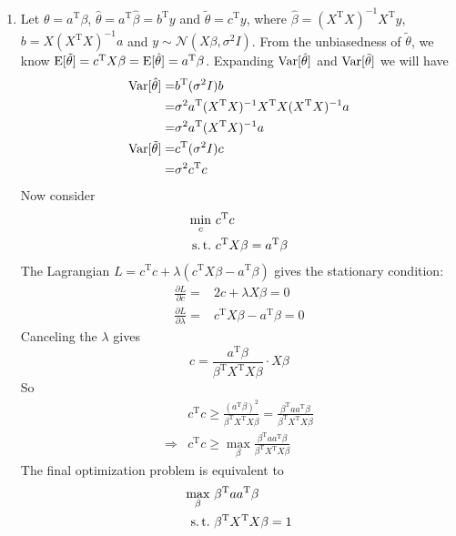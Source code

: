 \begin{sol}
\begin{enumerate}
\item
\label{3.3-1}
Let $\theta=a^\mathrm{T}\beta$, $\hat{\theta}=a^\mathrm{T}\hat{\beta}=b^\mathrm{T}y$ and $\tilde{\theta}=c^\mathrm{T}y$, where $\hat{\beta}=(X^{\mathrm{T}}X)^{-1}X^{\mathrm{T}}y$, $b=X(X^{\mathrm{T}}X)^{-1}a$ and $y\sim\mathcal{N}(X\beta,\sigma^2I)$. From the unbiasedness of $\tilde{\theta}$, we know $\operatorname{E}[\tilde{\theta}]=c^{\mathrm{T}}X\beta=\operatorname{E}[\hat{\theta}]=a^\mathrm{T}\beta$. Expanding $\operatorname{Var}[\hat{\theta}]$ and $\operatorname{Var}[\tilde{\theta}]$ we will have
\begin{align*}
\operatorname{Var}[\hat{\theta}] =& b^\mathrm{T}(\sigma^2 I)b\\
=& \sigma^2 a^\mathrm{T}(X^{\mathrm{T}}X)^{-1}X^\mathrm{T}X(X^{\mathrm{T}}X)^{-1}a\\
=& \sigma^2 a^\mathrm{T}(X^{\mathrm{T}}X)^{-1}a\\
\operatorname{Var}[\tilde{\theta}] =& c^\mathrm{T}(\sigma^2 I)c\\
=& \sigma^2 c^\mathrm{T}c
\end{align*}
Now consider
\begin{align*}
\min_c \ & c^\mathrm{T}c\\
\st & c^{\mathrm{T}}X\beta=a^\mathrm{T}\beta
\end{align*}
The Lagrangian $L=c^\mathrm{T}c+\lambda(c^{\mathrm{T}}X\beta-a^\mathrm{T}\beta)$ gives the stationary condition:
\begin{align*}
\frac{\partial L}{\partial c}=& 2c+\lambda X\beta=0\\
\frac{\partial L}{\partial \lambda}=& c^{\mathrm{T}}X\beta-a^\mathrm{T}\beta=0
\end{align*}
Canceling the $\lambda$ gives
\[
c=\frac{a^\mathrm{T}\beta}{\beta^{\mathrm{T}}X^{\mathrm{T}}X\beta}\cdot X\beta
\]
So
\begin{align*}
& c^\mathrm{T}c\ge \frac{\left(a^\mathrm{T}\beta\right)^2}{\beta^{\mathrm{T}}X^{\mathrm{T}}X\beta}=\frac{\beta^{\mathrm{T}}aa^{\mathrm{T}}\beta}{\beta^{\mathrm{T}}X^{\mathrm{T}}X\beta}\\
\Longrightarrow & c^\mathrm{T}c\ge \max_\beta \frac{\beta^{\mathrm{T}}aa^{\mathrm{T}}\beta}{\beta^{\mathrm{T}}X^{\mathrm{T}}X\beta}
\end{align*}
The final optimization problem is equivalent to
\begin{align*}
\max_\beta \ & \beta^{\mathrm{T}}aa^{\mathrm{T}}\beta\\
\st & \beta^{\mathrm{T}}X^{\mathrm{T}}X\beta=1

\end{align*}
\end{enumerate}
\end{sol}

